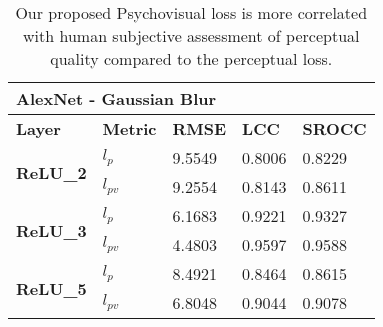 \documentclass[10pt,twocolumn,letterpaper]{article}
\begin{document}
\begin{table}[]
\caption{Our proposed Psychovisual loss is more correlated with human subjective assessment of perceptual quality compared to the perceptual loss.}
\begin{tabular}{|l|l|l|l|l|}
\hline
\multicolumn{5}{|l|}{\textbf{AlexNet - Gaussian Blur}}                                              \\ \hline
\textbf{Layer}                    & \textbf{Metric} & \textbf{RMSE} & \textbf{LCC} & \textbf{SROCC} \\ \hline
\multirow{2}{*}{\textbf{ReLU\_2}} &\textbf{$l_{p}$}              & 9.5549        & 0.8006       & 0.8229         \\ \cline{2-5}
                                  & \textbf{$l_{pv}$}             & 9.2554        & 0.8143       & 0.8611         \\ \hline
\multirow{2}{*}{\textbf{ReLU\_3}} & \textbf{$l_{p}$}              & 6.1683        & 0.9221       & 0.9327         \\ \cline{2-5}
                                  & \textbf{$l_{pv}$}             & 4.4803        & 0.9597       & 0.9588         \\ \hline
\multirow{2}{*}{\textbf{ReLU\_5}} & \textbf{$l_{p}$}              & 8.4921        & 0.8464       & 0.8615         \\ \cline{2-5}
                                  & \textbf{$l_{pv}$}             & 6.8048        & 0.9044       & 0.9078         \\ \hline
\end{tabular}
\end{table}
\end{document}
